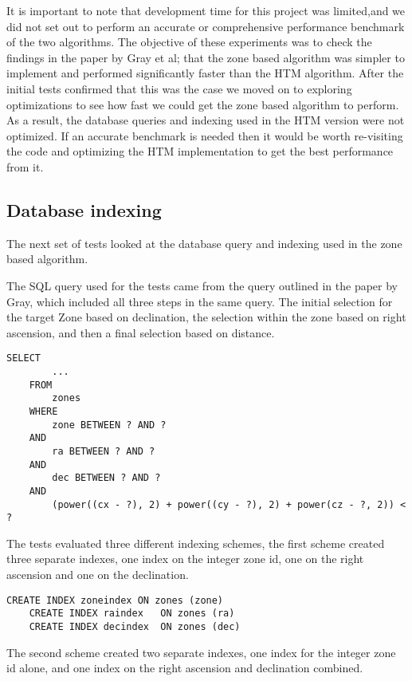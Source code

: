 \documentclass{article}
\begin{document}
It is important to note that development time for this project was limited,and we did not set out to perform an accurate or comprehensive performance benchmark of the two algorithms.
The objective of these experiments was to check the findings in the paper by Gray et al; that the zone based algorithm was simpler to implement and performed significantly faster than the HTM algorithm.
After the initial tests confirmed that this was the case we moved on to exploring optimizations to see how fast we could get the zone based algorithm to perform.
As a result, the database queries and indexing used in the HTM version were not optimized.
If an accurate benchmark is needed then it would be worth re-visiting the code and optimizing the HTM implementation to get the best performance from it.

\subsection{Database indexing}
\label{database-indexing}

The next set of tests looked at the database query and indexing used in the zone based algorithm.

The SQL query used for the tests came from the query outlined in the paper by Gray, which included all three steps in the same query. The initial selection for the target Zone based on declination, the selection within the zone based on right ascension, and then a final selection based on distance.

\begin{lstlisting}[style=SQL]
    SELECT
        ...
    FROM
        zones
    WHERE
        zone BETWEEN ? AND ?
    AND
        ra BETWEEN ? AND ?
    AND
        dec BETWEEN ? AND ?
    AND
        (power((cx - ?), 2) + power((cy - ?), 2) + power(cz - ?, 2)) < ?
\end{lstlisting}

The tests evaluated three different indexing schemes, the first scheme created three separate indexes, one index on the integer zone id, one on the right ascension and one on the declination.

\begin{lstlisting}[style=SQL]
    CREATE INDEX zoneindex ON zones (zone)
    CREATE INDEX raindex   ON zones (ra)
    CREATE INDEX decindex  ON zones (dec)
\end{lstlisting}

The second scheme created two separate indexes, one index for the integer zone id alone, and one index on the right ascension and declination combined.
\end{document}
